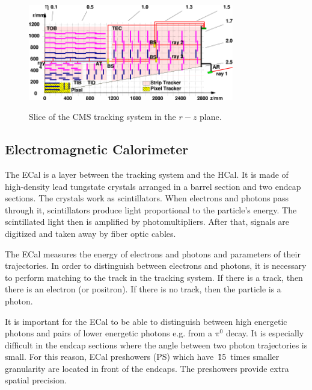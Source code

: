 \begin{figure}[htb]
  \begin{center}
    {\includegraphics[width=0.8\textwidth]{../figs/Exp/tracker_slice.png}}
    \caption{Slice of the CMS tracking system in the $r-z$ plane.}
    \label{fig:tracker_slice}
  \end{center}
\end{figure}

\subsection{Electromagnetic Calorimeter}

The ECal is a layer between the tracking system and the HCal. It is made of high-density lead tungstate crystals arranged in a barrel section and two endcap sections. The crystals work as scintillators. When electrons and photons pass through it, scintillators produce light proportional to the particle's energy. The scintillated light then is amplified by photomultipliers. After that, signals are digitized and taken away by fiber optic cables.

The ECal measures the energy of electrons and photons and parameters of their trajectories. In order to distinguish between electrons and photons, it is necessary to perform matching to the track in the tracking system. If there is a track, then there is an electron (or positron). If there is no track, then the particle is a photon.

It is important for the ECal to be able to distinguish between high energetic photons and pairs of lower energetic photons e.g. from a $\pi^0$ decay. It is especially difficult in the endcap sections where the angle between two photon trajectories is small. For this reason, ECal preshowers (PS) which have~\~15~times smaller granularity are located in front of the endcaps. The preshowers provide extra spatial precision. 


